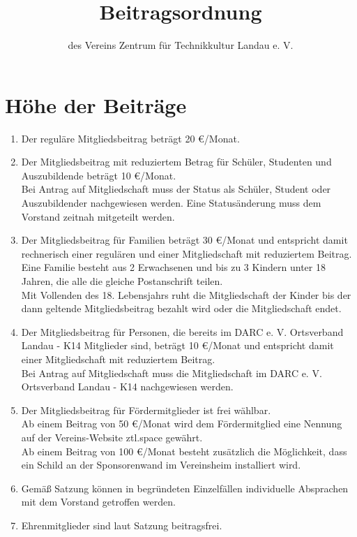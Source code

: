 \documentclass[a4paper, 12pt]{scrartcl}
\begin{document}
\title{Beitragsordnung}
\subtitle{des Vereins Zentrum für Technikkultur Landau e. V.}
\author{}
\date{}

\maketitle

\section{Höhe der Beiträge}
\begin{enumerate}
	\item Der reguläre Mitgliedsbeitrag beträgt 20 \euro/Monat.
	\item Der Mitgliedsbeitrag mit reduziertem Betrag für Schüler, Studenten und Auszubildende beträgt 10 \euro/Monat.\\ 
	Bei Antrag auf Mitgliedschaft muss der Status als Schüler, Student oder Auszubildender nachgewiesen werden.
	Eine Statusänderung muss dem Vorstand zeitnah mitgeteilt werden.
	\item Der Mitgliedsbeitrag für Familien beträgt 30 \euro/Monat und entspricht damit rechnerisch einer regulären und einer Mitgliedschaft mit reduziertem Beitrag. \\ 
Eine Familie besteht aus 2 Erwachsenen und bis zu 3 Kindern unter 18 Jahren, die alle die gleiche Postanschrift teilen.\\
Mit Vollenden des 18. Lebensjahrs ruht die Mitgliedschaft der Kinder bis der dann geltende Mitgliedsbeitrag bezahlt wird oder die Mitgliedschaft endet. 
	\item Der Mitgliedsbeitrag für Personen, die bereits im DARC e. V. Ortsverband Landau - K14 Mitglieder sind, beträgt 10 \euro/Monat und entspricht damit einer Mitgliedschaft mit reduziertem Beitrag.\\ Bei Antrag auf Mitgliedschaft muss die Mitgliedschaft im DARC e. V. Ortsverband Landau - K14 nachgewiesen werden.
	\item Der Mitgliedsbeitrag für Fördermitglieder ist frei wählbar. \\
	Ab einem Beitrag von 50 \euro/Monat wird dem Fördermitglied eine Nennung auf der Vereins-Website ztl.space gewährt. \\
	Ab einem Beitrag von 100 \euro/Monat besteht zusätzlich die Möglichkeit, dass ein Schild an der Sponsorenwand im Vereinsheim installiert wird.
	\item Gemäß Satzung können in begründeten Einzelfällen individuelle Absprachen mit dem Vorstand getroffen werden. 
	\item Ehrenmitglieder sind laut Satzung beitragsfrei.
\end{enumerate}
\end{document}
